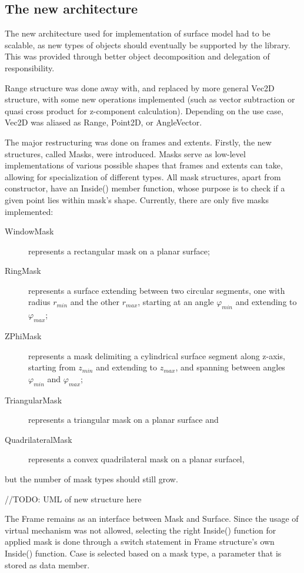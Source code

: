 \documentclass[12pt, a4paper]{article}
\begin{document}
\subsection{The new architecture}

The new architecture used for implementation of surface model had to be scalable, as new types of objects should eventually be supported by the library. This was provided through better object decomposition and delegation of responsibility.

Range structure was done away with, and replaced by more general Vec2D structure, with some new operations implemented (such as vector subtraction or quasi cross product for z-component calculation). Depending on the use case, Vec2D was aliased as Range, Point2D, or AngleVector. 

The major restructuring was done on frames and extents. Firstly, the new structures, called Masks, were introduced. Masks serve as low-level implementations of various possible shapes that frames and extents can take, allowing for specialization of different types. All mask structures, apart from constructor, have an {\selectfont Inside()} member function, whose purpose is to check if a given point lies within mask's shape. Currently, there are only five masks implemented:
\begin{description}
	\item [WindowMask] represents a rectangular mask on a planar surface;
	\item [RingMask] represents a surface extending between two circular segments, one with radius $r_{min}$ and the other $r_{max}$, starting at an angle $\varphi_{min}$ and extending to $\varphi_{max}$;
	\item [ZPhiMask] represents a mask delimiting a cylindrical surface segment along z-axis, starting from $z_{min}$ and extending to $z_{max}$, and spanning between angles $\varphi_{min}$ and $\varphi_{max}$;
	\item[TriangularMask\footnotemark] represents a triangular mask on a planar surface and
	\item[QuadrilateralMask] represents a convex quadrilateral mask on a planar surfacel,
\end{description}
but the number of mask types should still grow.

//TODO: UML of new structure here

The Frame remains as an interface between Mask and Surface. Since the usage of virtual mechanism was not allowed, selecting the right {\selectfont Inside()} function for applied mask is done through a switch statement in Frame structure's own {\selectfont Inside()} function. Case is selected based on a mask type, a parameter that is stored as data member.
\end{document}
